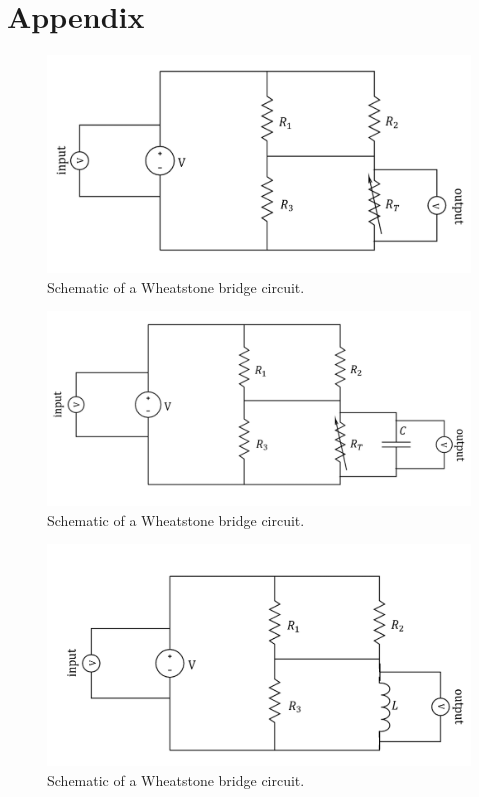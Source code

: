 \documentclass[12pt,a4paper,twoside]{article}
\begin{document}
\clearpage

\section*{Appendix}

\begin{figure}[!h]
    \centering
    \includegraphics[width = 0.7\linewidth]{wheatstone-resistor.png}
    \caption{Schematic of a Wheatstone bridge circuit.}
    \label{fig:wheat-res}
\end{figure}

\begin{figure}[!h]
    \centering
    \includegraphics[width = 0.7\linewidth]{wheatstone-capacitor.png}
    \caption{Schematic of a Wheatstone bridge circuit.}
    \label{fig:wheat-cap}
\end{figure}

\begin{figure}[!h]
    \centering
    \includegraphics[width = 0.7\linewidth]{wheatstone-inductor.png}
    \caption{Schematic of a Wheatstone bridge circuit.}
    \label{fig:wheat-ind}
\end{figure}
\end{document}
